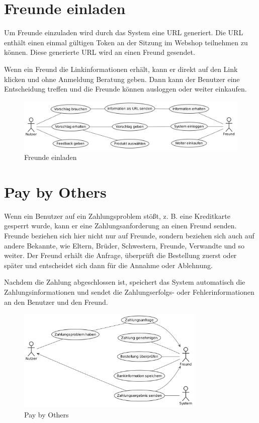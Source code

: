 \section{Freunde einladen}

Um Freunde einzuladen wird durch das System eine URL generiert. Die URL enthält einen einmal gültigen Token an der Sitzung im Webshop teilnehmen zu können. Diese generierte URL wird an einen Freund gesendet.

Wenn ein Freund die Linkinformationen erhält, kann er direkt auf den Link klicken und ohne Anmeldung Beratung geben. Dann kann der Benutzer eine Entscheidung treffen und die Freunde können ausloggen oder weiter einkaufen.

\begin{figure}[htbp]
	\centering
	\includegraphics[width=1\textwidth]{uml-diagramme/freunde-einladen.png}
	\caption{Freunde einladen}
	\label{fig:freunde-einladen}
\end{figure}


\newpage

\section{Pay by Others}

Wenn ein Benutzer auf ein Zahlungsproblem stößt, z. B. eine Kreditkarte gesperrt wurde, kann er eine Zahlungsanforderung an einen Freund senden. Freunde beziehen sich hier nicht nur auf Freunde, sondern beziehen sich auch auf andere Bekannte, wie Eltern, Brüder, Schwestern, Freunde, Verwandte und so weiter. Der Freund erhält die Anfrage, überprüft die Bestellung zuerst oder später und entscheidet sich dann für die Annahme oder Ablehnung.

Nachdem die Zahlung abgeschlossen ist, speichert das System automatisch die Zahlungsinformationen und sendet die Zahlungserfolgs- oder Fehlerinformationen an den Benutzer und den Freund.

\begin{figure}[htbp]
	\centering
	\includegraphics[width=0.8\textwidth]{uml-diagramme/pay-by-others.png}
	\caption{Pay by Others}
	\label{fig:pay-by-others}
\end{figure}


